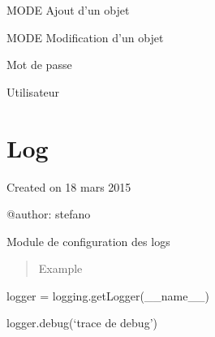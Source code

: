 \documentclass[letterpaper,10pt,french]{sphinxmanual}
\begin{document}

\begin{fulllineitems}
\label{constantes:constantes.MODE_ADD}
MODE Ajout d'un objet

\end{fulllineitems}


\begin{fulllineitems}
\label{constantes:constantes.MODE_MOD}
MODE Modification d'un objet

\end{fulllineitems}


\begin{fulllineitems}
\label{constantes:constantes.PROXY_PWD}
Mot de passe

\end{fulllineitems}


\begin{fulllineitems}
\label{constantes:constantes.PROXY_USER}
Utilisateur

\end{fulllineitems}



\chapter{Log}
\label{log::doc}\label{log:module-log}\label{log:log}
Created on 18 mars 2015

@author: stefano

Module de configuration des logs
\begin{quote}\begin{description}
\item[{Example}] \leavevmode
\end{description}\end{quote}

logger = logging.getLogger(\_\_name\_\_)

logger.debug(`trace de debug')
\end{document}
